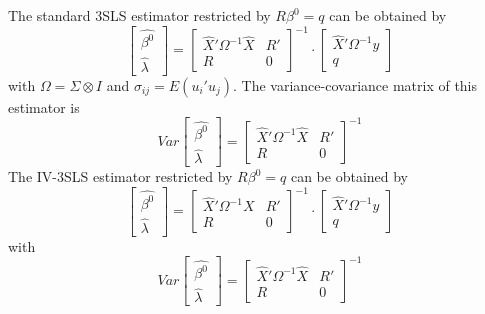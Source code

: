 The standard 3SLS estimator restricted by $R \beta^0 = q$ can be obtained by
\begin{equation}
   \left[ \begin{array}{c}
      \widehat{\beta^0} \\ \widehat{\lambda}
   \end{array} \right]
   =
   \left[ \begin{array}{cc}
      \widehat{X}' \Omega^{-1} \widehat{X} & R' \\ 
      R & 0
   \end{array} \right]^{-1}
   \cdot
   \left[ \begin{array}{c}
      \widehat{X}' \Omega^{-1} y \\ q 
   \end{array} \right]
   \label{eq:3slsGlsR}
\end{equation}
with $\Omega = \Sigma \otimes I$ and
$\sigma_{ij} = E \left( u_i' u_j \right)$.
The variance-covariance matrix of this estimator is
\begin{equation}
   Var 
   \left[ \begin{array}{c}
      \widehat{\beta^0} \\ \widehat{\lambda}
   \end{array} \right] 
   = 
   \left[ \begin{array}{cc}
      \widehat{X}' \Omega^{-1} \widehat{X} & R' \\ 
      R & 0
   \end{array} \right]^{-1}
   \label{eq:cov3slsr}
\end{equation}
The IV-3SLS estimator restricted by $R \beta^0 = q$ can be obtained by
\begin{equation}
   \left[ \begin{array}{c}
      \widehat{\beta^0} \\ \widehat{\lambda}
   \end{array} \right]
   =
   \left[ \begin{array}{cc}
      \widehat{X}' \Omega^{-1} X & R' \\ 
      R & 0
   \end{array} \right]^{-1}
   \cdot
   \left[ \begin{array}{c}
      \widehat{X}' \Omega^{-1} y \\ q 
   \end{array} \right]
   \label{eq:3slsIvR}
\end{equation}
with
\begin{equation}
   Var 
   \left[ \begin{array}{c}
      \widehat{\beta^0} \\ \widehat{\lambda}
   \end{array} \right] 
   = 
   \left[ \begin{array}{cc}
      \widehat{X}' \Omega^{-1} \widehat{X} & R' \\ 
      R & 0
   \end{array} \right]^{-1}
\end{equation}
